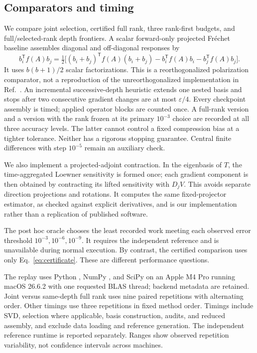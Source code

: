 \documentclass[10pt,letterpaper,twoside]{article}
\begin{document}
\subsection{Comparators and timing}
We compare joint selection, certified full rank, three rank-first budgets,
and full/selected-rank depth frontiers. A scalar forward-only projected
Fr\'echet baseline assembles diagonal and off-diagonal responses by
\begin{equation}
 b_i^{\mathsf T}f(A)b_j=\tfrac12\big[
 (b_i+b_j)^{\mathsf T}f(A)(b_i+b_j)-b_i^{\mathsf T}f(A)b_i-b_j^{\mathsf T}f(A)b_j\big].
\end{equation}
It uses $b(b+1)/2$ scalar factorizations. This is a reorthogonalized
polarization comparator, not a reproduction of the unreorthogonalized
implementation in Ref.~\cite{singh2026}. An incremental successive-depth
heuristic extends one nested basis and stops after two consecutive gradient
changes are at most $\varepsilon/4$. Every checkpoint assembly is timed;
applied operator blocks are counted once. A full-rank version and a version
with the rank frozen at its primary $10^{-3}$ choice are recorded at all
three accuracy levels. The latter cannot control a fixed compression bias
at a tighter tolerance. Neither has a rigorous stopping guarantee. Central
finite differences with step $10^{-5}$ remain an auxiliary check.

We also implement a projected-adjoint contraction. In the eigenbasis of $T$,
the time-aggregated Loewner sensitivity is formed once; each gradient component
is then obtained by contracting its lifted sensitivity with $D_jV$.
This avoids separate direction projections and rotations. It computes the
same fixed-projector estimator, as checked against explicit derivatives, and
is our implementation rather than a replication of published software.

The post hoc oracle chooses the least recorded work meeting each observed
error threshold $10^{-3},10^{-6},10^{-9}$. It requires the independent reference
and is unavailable during normal execution. By contrast, the certified comparison
uses only Eq.~\eqref{eq:certificate}. These are different performance questions.

The replay uses Python \PythonVersion{}, NumPy \NumpyVersion{}, and SciPy
\ScipyVersion{} on an Apple M4 Pro running macOS 26.6.2 with one requested BLAS thread; backend
metadata are retained. Joint versus same-depth full rank uses nine paired
repetitions with alternating order. Other timings use three repetitions in
fixed method order. Timings include SVD, selection where applicable, basis
construction, audits, and reduced assembly, and exclude data loading and reference
generation. The independent reference runtime is reported separately. Ranges
show observed repetition variability, not confidence intervals across machines.
\end{document}

